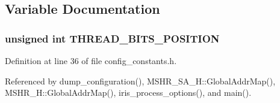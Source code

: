 \subsection{Variable Documentation}
\subsubsection[{THREAD\_\-BITS\_\-POSITION}]{\setlength{\rightskip}{0pt plus 5cm}unsigned int {\bf THREAD\_\-BITS\_\-POSITION}}\label{mshr_8cc_581f0c063e972c5f202149f2e3ce7452}




Definition at line 36 of file config\_\-constants.h.

Referenced by dump\_\-configuration(), MSHR\_\-SA\_\-H::GlobalAddrMap(), MSHR\_\-H::GlobalAddrMap(), iris\_\-process\_\-options(), and main().